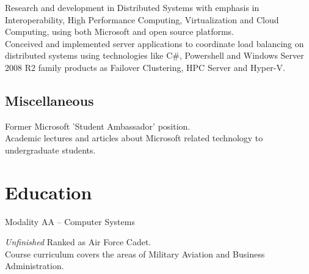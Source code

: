 \documentclass[11pt, a4paper, sans]{moderncv} %
\begin{document}
{
Research and development in Distributed Systems with emphasis in Interoperability, High Performance Computing, Virtualization and Cloud Computing, using both Microsoft and open source platforms.\\
Conceived and implemented server applications to coordinate load balancing on distributed systems using technologies like C\#, Powershell and Windows Server 2008 R2 family products as Failover Clustering, HPC Server and Hyper-V.
}




\subsection{Miscellaneous}




{
Former Microsoft 'Student Ambassador' position.\\
Academic lectures and articles about Microsoft related technology to undergraduate students.
}









\section{Education}

{
Modality AA -- Computer Systems
}  

{\textit{Unfinished}}
{
Ranked as Air Force Cadet. \\
Course curriculum covers the areas of Military Aviation and Business Administration. 
}
\end{document}
